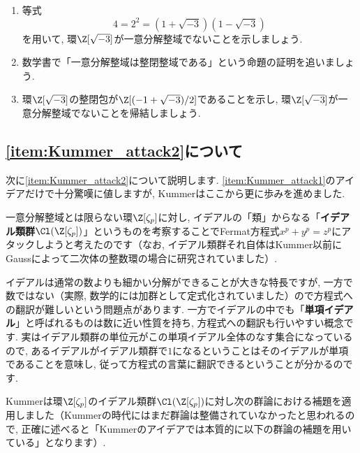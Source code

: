 \documentclass[11pt,b5paper,oneside,titlepage,lualatex]{ltjsreport}
\begin{document}
\begin{exc}{}{}
	\begin{enumerate}
		\item 等式
		\[
		4 = 2^2 = (1 + \sqrt{-3}) (1 - \sqrt{-3})
		\]
		を用いて, 環$ \Z[\sqrt{-3}] $が一意分解整域でないことを示しましょう. 
		\item 数学書で「一意分解整域は整閉整域である」という命題の証明を追いましょう. 
		\item 環$ \Z[\sqrt{-3}] $の整閉包が$ \Z[(-1 + \sqrt{-3})/2] $であることを示し, 環$ \Z[\sqrt{-3}] $が一意分解整域でないことを帰結しましょう. 
	\end{enumerate}
\end{exc}


\subsection{\ref{item:Kummer_attack2}について}


次に\ref{item:Kummer_attack2}について説明します. 
\ref{item:Kummer_attack1}のアイデアだけで十分驚嘆に値しますが, Kummerはここから更に歩みを進めました. 

一意分解整域とは限らない環$ \Z[\zeta_p] $に対し, イデアルの「類」からなる「\textbf{イデアル類群}$ \Cl(\Z[\zeta_p]) $」というものを考察することでFermat方程式$ x^p + y^p = z^p $にアタックしようと考えたのです（なお, イデアル類群それ自体はKummer以前にGaussによって二次体の整数環の場合に研究されていました）. 

イデアルは通常の数よりも細かい分解ができることが大きな特長ですが, 一方で数ではない（実際, 数学的には加群として定式化されていました）ので方程式への翻訳が難しいという問題点があります. 
一方でイデアルの中でも「\textbf{単項イデアル}」と呼ばれるものは数に近い性質を持ち, 方程式への翻訳も行いやすい概念です. 
実はイデアル類群の単位元がこの単項イデアル全体のなす集合になっているので, あるイデアルがイデアル類群で$ 1 $になるということはそのイデアルが単項であることを意味し, 従って方程式の言葉に翻訳できるということが分かるのです. 

Kummerは環$ \Z[\zeta_p] $のイデアル類群$ \Cl(\Z[\zeta_p]) $に対し次の群論における補題を適用しました（Kummerの時代にはまだ群論は整備されていなかったと思われるので, 正確に述べると「Kummerのアイデアでは本質的に以下の群論の補題を用いている」となります）. 
\end{document}
